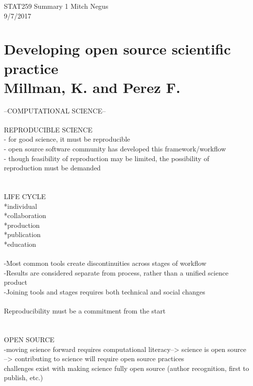 \documentclass{report}
\begin{document}
\thispagestyle{empty}
\sffamily

\large {STAT259 Summary {1} \hfill Mitch Negus\\
		\hspace*{\fill} 9/7/2017\\ }
\section*{\textsf{Developing open source scientific practice \\ \normalsize Millman, K. and Perez F.}}

--COMPUTATIONAL SCIENCE--\\
\-\\
REPRODUCIBLE SCIENCE\\
- for good science, it must be reproducible\\
- open source software community has developed this framework/workflow\\
- though feasibility of reproduction may be limited, the possibility of reproduction must be demanded\\
\-\\
\-\\
LIFE CYCLE\\
*individual\\
*collaboration\\
*production\\
*publication\\
*education\\
\-\\
-Most common tools create discontinuities across stages of workflow\\
-Results are considered separate from process, rather than a unified science product\\
-Joining tools and stages requires both technical and social changes\\
\-\\
Reproducibility must be a commitment from the start\\
\-\\
\-\\
OPEN SOURCE\\
-moving science forward requires computational literacy--> science is open source --> contributing to science will require open source practices\\
challenges exist with making science fully open source (author recognition, first to publish, etc.)\\
\-\\
\end{document}
